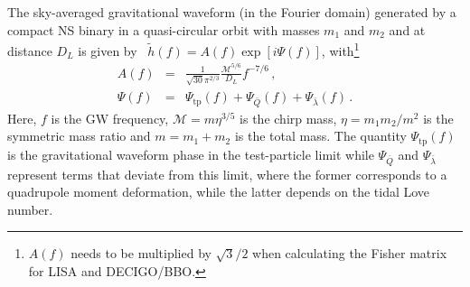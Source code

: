 \documentclass[aps,twocolumn,nofootinbib,showpacs,superscriptaddress,hyperref]{revtex4-1}
\newcommand\ba{\begin{eqnarray}}
\newcommand\ea{\end{eqnarray}}
\newcommand{\mrm}{\mathrm}
\newcommand{\Qbar}{\bar{Q}}
\begin{document}
The sky-averaged gravitational waveform (in the Fourier domain) generated by a compact NS binary in a quasi-circular orbit with masses $m_1$ and $m_2$ and at distance $D_L$ is given by~\cite{cutlerflanagan} $\tilde{h}(f) = A(f) \exp [i \Psi(f)]$, with\footnote{$A(f)$ needs to be multiplied by $\sqrt{3}/2$ when calculating the Fisher matrix for LISA and DECIGO/BBO.}
%
\ba
A(f) &=& \frac{1}{\sqrt{30} \pi^{2/3}} \frac{\mathcal{M}^{5/6}}{D_L} f^{-7/6}\,, \\
\Psi(f) &=& \Psi_\mrm{tp}(f) + \Psi_{\bar{Q}} (f) +\Psi_{\bar{\lambda}} (f)\,.
\ea
% 
Here, $f$ is the GW frequency, $\mathcal{M} =  m \eta^{3/5}$ is the chirp mass, $\eta = {m_1 m_2}/{m^2}$ is the symmetric mass ratio and $m =  m_1 + m_2$ is the total mass. The quantity $\Psi_\mrm{tp}(f)$ is the gravitational waveform phase in the test-particle limit while $\Psi_{\Qbar}$ and $\Psi_{\bar{\lambda}}$ represent terms that deviate from this limit, where the former corresponds to a quadrupole moment deformation, while the latter depends on the tidal Love number. 
\end{document}

